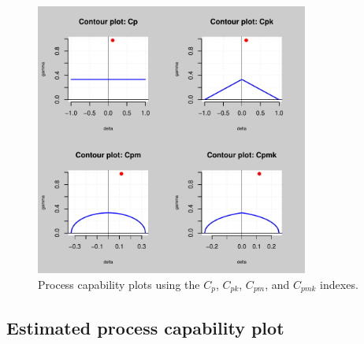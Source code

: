 \begin{figure}[!htb]
\begin{center}
\includegraphics[width=0.8\textwidth]{article-cpplot-plot}
\caption{Process capability plots using the $C_p$, $C_{pk}$, $C_{pm}$, and $C_{pmk}$ indexes.}
\label{fig:cpplot}
\end{center}
\end{figure}

\subsection{Estimated process capability plot}


